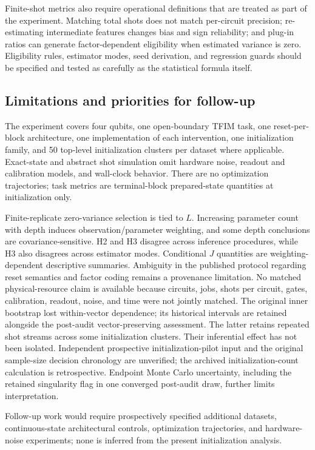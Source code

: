 \documentclass[pdflatex,sn-mathphys-num,Numbered]{sn-jnl}
\begin{document}
Finite-shot metrics also require operational definitions that are treated as part of the experiment. Matching total shots does not match per-circuit precision; re-estimating intermediate features changes bias and sign reliability; and plug-in ratios can generate factor-dependent eligibility when estimated variance is zero. Eligibility rules, estimator modes, seed derivation, and regression guards should be specified and tested as carefully as the statistical formula itself.

\subsection{Limitations and priorities for follow-up}\label{sec:limitations}

The experiment covers four qubits, one open-boundary TFIM task, one reset-per-block architecture, one implementation of each intervention, one initialization family, and 50 top-level initialization clusters per dataset where applicable. Exact-state and abstract shot simulation omit hardware noise, readout and calibration models, and wall-clock behavior. There are no optimization trajectories; task metrics are terminal-block prepared-state quantities at initialization only.

Finite-replicate zero-variance selection is tied to $L$. Increasing parameter count with depth induces observation/parameter weighting, and some depth conclusions are covariance-sensitive. H2 and H3 disagree across inference procedures, while H3 also disagrees across estimator modes. Conditional $J$ quantities are weighting-dependent descriptive summaries. Ambiguity in the published protocol regarding reset semantics and factor coding remains a provenance limitation. No matched physical-resource claim is available because circuits, jobs, shots per circuit, gates, calibration, readout, noise, and time were not jointly matched. The original inner bootstrap lost within-vector dependence; its historical intervals are retained alongside the post-audit vector-preserving assessment. The latter retains repeated shot streams across some initialization clusters. Their inferential effect has not been isolated. Independent prospective initialization-pilot input and the original sample-size decision chronology are unverified; the archived initialization-count calculation is retrospective. Endpoint Monte Carlo uncertainty, including the retained singularity flag in one converged post-audit draw, further limits interpretation.

Follow-up work would require prospectively specified additional datasets, continuous-state architectural controls, optimization trajectories, and hardware-noise experiments; none is inferred from the present initialization analysis.
\end{document}
